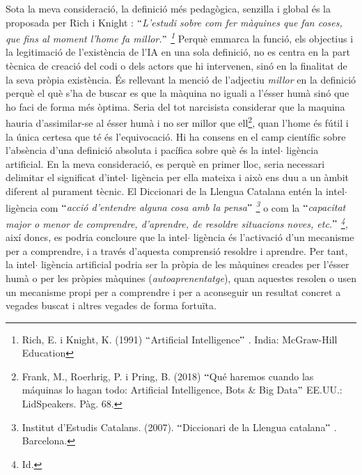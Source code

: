 \documentclass[12pt]{article}
\begin{document}
\vspace{\baselineskip}
\begin{justify}
Sota la meva consideració, la definició més pedagògica, senzilla i global és la proposada per Rich i Knight : $``$\textit{L’estudi sobre com fer màquines que fan coses, que fins al moment l’home fa millor.$"$ \footnote{ Rich, E. i Knight, K. (1991) $``$Artificial Intelligence$"$ . India: McGraw-Hill Education } }Perquè emmarca la funció, els objectius i la legitimació de l’existència de l’IA en una sola definició, no es centra en la part tècnica de creació del codi o dels actors que hi intervenen, sinó en la finalitat de la seva pròpia existència. És rellevant la menció de l’adjectiu \textit{millor }en la definició perquè el què s’ha de buscar es que la màquina no iguali a l’ésser humà sinó que ho faci de forma més òptima. Seria del tot narcisista considerar que la maquina hauria d’assimilar-se al ésser humà i no ser millor que ell\footnote{ Frank, M., Roerhrig, P. i Pring, B. (2018) $``$Qué haremos cuando las máquinas lo hagan todo: Artificial Intelligence, Bots $\&$  Big Data$"$  EE.UU.: LidSpeakers. Pàg. 68.  }, quan l’home és fútil i la única certesa que té és l’equivocació. Hi ha consens en el camp científic sobre l’absència d’una definició absoluta i pacífica sobre què és la intel$ \cdot $ ligència artificial. En la meva consideració, es perquè en primer lloc, seria necessari delimitar el significat d’intel$ \cdot $ ligència per ella mateixa i això ens duu a un àmbit diferent al purament tècnic. El Diccionari de la Llengua Catalana entén la intel$ \cdot $ ligència com $``$\textit{acció d’entendre alguna cosa amb la pensa$"$ \footnote{ Institut d’Estudis Catalans. (2007). $``$Diccionari de la Llengua catalana$"$ . Barcelona. } }o com la \textit{$``$capacitat major o menor de comprendre, d’aprendre, de resoldre situacions noves, etc.$"$ \footnote{ Id.  }, }així doncs, es podria concloure que la intel$ \cdot $ ligència és l’activació d’un mecanisme per a comprendre, i a través d’aquesta comprensió resoldre i aprendre. Per tant, la intel$ \cdot $ ligència artificial podria ser la pròpia de les màquines creades per l’ésser humà o per les pròpies màquines (\textit{autoaprenentatge}), quan aquestes resolen o usen un mecanisme propi per a comprendre i per a aconseguir un resultat concret a vegades buscat i altres vegades de forma fortuïta.
\end{justify}\par
\end{document}
